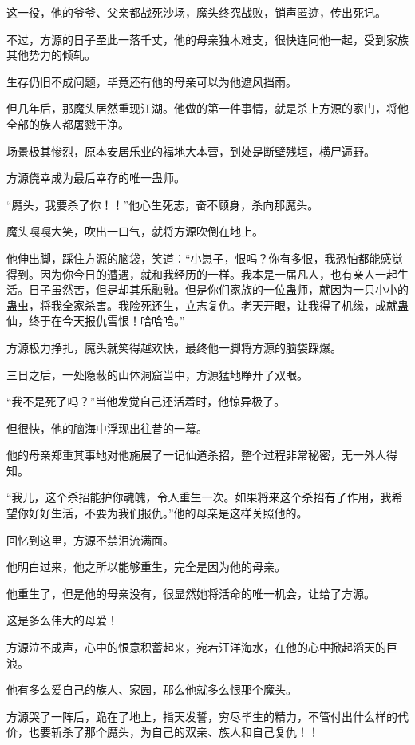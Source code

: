 \begin{this_body}
这一役，他的爷爷、父亲都战死沙场，魔头终究战败，销声匿迹，传出死讯。

不过，方源的日子至此一落千丈，他的母亲独木难支，很快连同他一起，受到家族其他势力的倾轧。

生存仍旧不成问题，毕竟还有他的母亲可以为他遮风挡雨。

但几年后，那魔头居然重现江湖。他做的第一件事情，就是杀上方源的家门，将他全部的族人都屠戮干净。

场景极其惨烈，原本安居乐业的福地大本营，到处是断壁残垣，横尸遍野。

方源侥幸成为最后幸存的唯一蛊师。

“魔头，我要杀了你！！”他心生死志，奋不顾身，杀向那魔头。

魔头嘎嘎大笑，吹出一口气，就将方源吹倒在地上。

他伸出脚，踩住方源的脑袋，笑道：“小崽子，恨吗？你有多恨，我恐怕都能感觉得到。因为你今日的遭遇，就和我经历的一样。我本是一届凡人，也有亲人一起生活。日子虽然苦，但是却其乐融融。但是你们家族的一位蛊师，就因为一只小小的蛊虫，将我全家杀害。我险死还生，立志复仇。老天开眼，让我得了机缘，成就蛊仙，终于在今天报仇雪恨！哈哈哈。”

方源极力挣扎，魔头就笑得越欢快，最终他一脚将方源的脑袋踩爆。

三日之后，一处隐蔽的山体洞窟当中，方源猛地睁开了双眼。

“我不是死了吗？”当他发觉自己还活着时，他惊异极了。

但很快，他的脑海中浮现出往昔的一幕。

他的母亲郑重其事地对他施展了一记仙道杀招，整个过程非常秘密，无一外人得知。

“我儿，这个杀招能护你魂魄，令人重生一次。如果将来这个杀招有了作用，我希望你好好生活，不要为我们报仇。”他的母亲是这样关照他的。

回忆到这里，方源不禁泪流满面。

他明白过来，他之所以能够重生，完全是因为他的母亲。

他重生了，但是他的母亲没有，很显然她将活命的唯一机会，让给了方源。

这是多么伟大的母爱！

方源泣不成声，心中的恨意积蓄起来，宛若汪洋海水，在他的心中掀起滔天的巨浪。

他有多么爱自己的族人、家园，那么他就多么恨那个魔头。

方源哭了一阵后，跪在了地上，指天发誓，穷尽毕生的精力，不管付出什么样的代价，也要斩杀了那个魔头，为自己的双亲、族人和自己复仇！！


\end{this_body}
